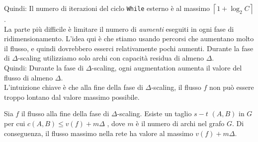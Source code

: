 Quindi: Il numero di iterazioni del ciclo \texttt{While}
esterno è al massimo $\left\lceil 1 + \log_2 C \right\rceil$.\\

La parte più difficile è limitare il numero di \emph{aumenti} eseguiti
in ogni fase di ridimensionamento. L'idea qui è che stiamo usando
percorsi che aumentano molto il flusso, e quindi dovrebbero esserci
relativamente pochi aumenti. Durante la fase di $\Delta$-scaling
utilizziamo solo archi con capacità residua di almeno $\Delta$.\\

Quindi: Durante la fase di $\Delta$-scaling, ogni
augmentation aumenta il valore del flusso di almeno $\Delta$.\\

L'intuizione chiave è che alla fine della fase di $\Delta$-scaling, il
flusso $f$ non può essere troppo lontano dal valore massimo possibile.

\begin{myblockquote}
  \begin{minipage}{\textwidth}
    \begin{theorem}
      Sia $f$ il flusso alla fine della fase di $\Delta$-scaling. Esiste
      un taglio $s-t$ $(A, B)$ in $G$ per cui
      $c(A, B) \le v(f) + m\Delta$ , dove $m$ è il numero di archi nel
      grafo $G$. Di conseguenza, il flusso massimo nella rete ha valore al
      massimo $v(f) + m\Delta$.
    \end{theorem}
  \end{minipage}
\end{myblockquote}


